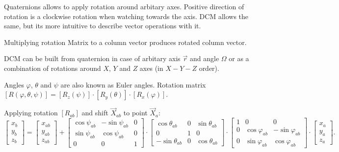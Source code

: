 \documentclass[10pt,letterpaper]{article}
\numberwithin{equation}{section}
\numberwithin{figure}{section}
\numberwithin{table}{section}
\begin{document}
Quaternions allows to apply rotation around arbitary axes. Positive direction of rotation
is a clockwise rotation when watching towards the axis. DCM allows the same, but its
more intuitive to describe vector operations with it.

Multiplying rotation Matrix to a column vector produces rotated column vector.

DCM can be built from quaternion in case of arbitary axis $\vec{r}$ and angle $\Omega$ or
as a combination of rotations around $X$, $Y$ and $Z$ axes (in $X-Y-Z$ order).

Angles $\varphi$, $\theta$ and $\psi$ are also known as Euler angles. Rotation matrix
$[R(\varphi, \theta, \psi)] = [R_{z}(\psi)] \cdot [R_{y}(\theta)] \cdot [R_{x}(\varphi)]$.

Applying rotation $[R_{ab}]$ and shift $\vec{X}_{ab}$ to point $\vec{X}_{a}$:
\begin{equation}
    \begin{bmatrix}
        x_{b} \\ y_{b} \\ z_{b}
    \end{bmatrix} = \begin{bmatrix}
        x_{ab} \\ y_{ab} \\ z_{ab}
    \end{bmatrix} + \begin{bmatrix}
         \cos \psi_{ab}   & -\sin \psi_{ab}    & 0                  \\
         \sin \psi_{ab}   &  \cos \psi_{ab}    & 0                  \\
        0                 & 0                  & 1
    \end{bmatrix} \cdot \begin{bmatrix}
         \cos \theta_{ab} & 0                  &  \sin \theta_{ab}  \\
        0                 & 1                  & 0                  \\
        -\sin \theta_{ab} & 0                  &  \cos \theta_{ab}
    \end{bmatrix} \cdot \begin{bmatrix}
        1                 & 0                  & 0                  \\
        0                 &  \cos \varphi_{ab} & -\sin \varphi_{ab} \\
        0                 &  \sin \varphi_{ab} &  \cos \varphi_{ab}
    \end{bmatrix} \cdot \begin{bmatrix}
        x_{a} \\ y_{a} \\ z_{a}
    \end{bmatrix}.
    \label{equ:rot_xyz}
\end{equation}
\end{document}
